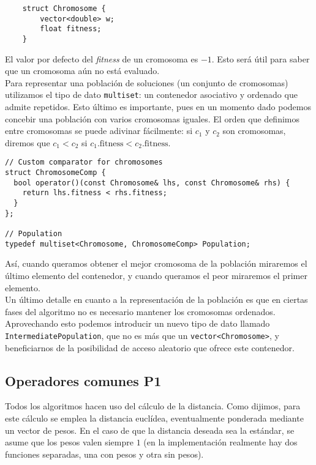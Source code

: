 \documentclass[12pt]{article}
\begin{document}
\begin{verbatim}
	struct Chromosome {
	    vector<double> w;
	    float fitness;
	}
\end{verbatim}

El valor por defecto del \textit{fitness} de un cromosoma es $-1$. Esto será útil para saber que un cromosoma aún no está evaluado.\\

Para representar una población de soluciones (un conjunto de cromosomas) utilizamos el tipo de dato \verb|multiset|: un contenedor asociativo y ordenado que admite repetidos. Esto último es importante, pues en un momento dado podemos concebir una población con varios cromosomas iguales. El orden que definimos entre cromosomas se puede adivinar fácilmente: si $c_1$ y $c_2$ son cromosomas, diremos que $c_1 < c_2$ si $c_1.\text{fitness} < c_2.\text{fitness}$.

\begin{verbatim}
// Custom comparator for chromosomes
struct ChromosomeComp {
  bool operator()(const Chromosome& lhs, const Chromosome& rhs) {
    return lhs.fitness < rhs.fitness;
  }
};

// Population
typedef multiset<Chromosome, ChromosomeComp> Population;
\end{verbatim}

Así, cuando queramos obtener el mejor cromosoma de la población miraremos el último elemento del contenedor, y cuando queramos el peor miraremos el primer elemento.\\

Un último detalle en cuanto a la representación de la población es que en ciertas fases del algoritmo no es necesario mantener los cromosomas ordenados. Aprovechando esto podemos introducir un nuevo tipo de dato llamado \verb|IntermediatePopulation|, que no es más que un \verb|vector<Chromosome>|, y beneficiarnos de la posibilidad de acceso aleatorio que ofrece este contenedor.

\subsection*{{\color{red}Operadores comunes P1}}

Todos los algoritmos hacen uso del cálculo de la distancia. Como dijimos, para este cálculo se emplea la distancia euclídea, eventualmente ponderada mediante un vector de pesos. En el caso de que la distancia deseada sea la estándar, se asume que los pesos valen siempre $1$ (en la implementación realmente hay dos funciones separadas, una con pesos y otra sin pesos).
\end{document}
